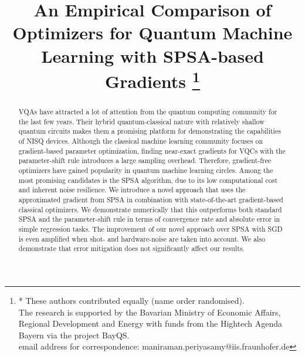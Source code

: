 \documentclass[conference]{IEEEtran}
\begin{document}
%



\title{An Empirical Comparison of Optimizers for Quantum Machine Learning with SPSA-based Gradients
\thanks{

* These authors contributed equally (name order randomised). \\
The research is supported by the Bavarian Ministry of Economic Affairs, Regional Development and Energy with funds from the Hightech Agenda Bayern via the project BayQS.\\
email address for correspondence: 
maniraman.periyasamy@iis.fraunhofer.de}
}

\author{
%
}



\maketitle

\begin{abstract}
\Glspl{VQA} have attracted a lot of attention from the quantum computing community for the last few years. Their hybrid quantum-classical nature with relatively shallow quantum circuits makes them a promising platform for demonstrating the capabilities of \gls{NISQ} devices. Although the classical machine learning community focuses on gradient-based parameter optimization, finding near-exact gradients for \glspl{VQC} with the parameter-shift rule introduces a large sampling overhead. Therefore, gradient-free optimizers have gained popularity in quantum machine learning circles. Among the most promising candidates is the \gls{SPSA} algorithm, due to its low computational cost and inherent noise resilience. We introduce a novel approach that uses the approximated gradient from \gls{SPSA} in combination with state-of-the-art gradient-based classical optimizers. We demonstrate numerically that this outperforms both standard \gls{SPSA} and the parameter-shift rule in terms of convergence rate and absolute error in simple regression tasks. The improvement of our novel approach over \gls{SPSA} with \gls{SGD} is even amplified when shot- and hardware-noise are taken into account. We also demonstrate that error mitigation does not significantly affect our results.
\end{abstract}
\end{document}
